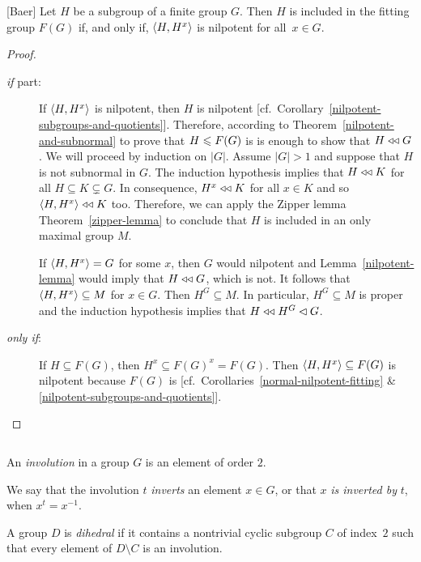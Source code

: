 \begin{thm}\label{baer-thm}{\rm[Baer]}
    Let\/ $H$ be a subgroup of a finite group\/ $G$. Then $H$ is included in the fitting group $F(G)$ if, and only if, $\langle H,H^x\rangle$ is nilpotent for all\/~$x\in G$.
\end{thm}

\begin{proof}${}$

\begin{description}
    \item[\rm{\it if\/} part:] If $\langle H,H^x\rangle$ is nilpotent, then $H$ is nilpotent [cf.~Corollary~\ref{nilpotent-subgroups-and-quotients}]. Therefore, according to Theorem~\ref{nilpotent-and-subnormal} to prove that $H\leqslant F(G)$ is is enough to show that $H\mathrel{\triangleleft\triangleleft} G$. We will proceed by induction on $|G|$. Assume $|G|>1$ and suppose that $H$ is not subnormal in $G$. The induction hypothesis implies that $H\mathrel{\triangleleft\triangleleft} K$ for all $H\subseteq K\varsubsetneq G$. In consequence, $H^x\mathrel{\triangleleft\triangleleft} K$ for all $x\in K$ and so $\langle H,H^x\rangle\mathrel{\triangleleft\triangleleft} K$ too. Therefore, we can apply the Zipper lemma Theorem~\ref{zipper-lemma} to conclude that $H$ is included in an only maximal group $M$.

    If $\langle H,H^x\rangle=G$ for some $x$, then $G$ would nilpotent and Lemma~\ref{nilpotent-lemma} would imply that $H\mathrel{\triangleleft\triangleleft} G$, which is not. It follows that $\langle H,H^x\rangle\subseteq M$ for $x\in G$. Then $H^G\subseteq M$. In particular, $H^G\subseteq M$ is proper and the induction hypothesis implies that $H\mathrel{\triangleleft\triangleleft} H^G\lhd G$.

    \item[\rm{\it only if\/}:] If $H\subseteq F(G)$, then $H^x\subseteq F(G)^x=F(G)$. Then $\langle H,H^x\rangle\subseteq F(G)$ is nilpotent because $F(G)$ is [cf.~Corollaries~\ref{normal-nilpotent-fitting} \& \ref{nilpotent-subgroups-and-quotients}].
\end{description}
\end{proof}


\begin{defns}${}$\label{def:dihedral-group}

    An \textsl{involution} in a group\/ $G$ is an element of order\/ $2$.

    We say that the involution $t$ \textsl{inverts} an element $x\in G$, or that $x$ \textsl{is inverted by} $t$, when $x^t=x^{-1}$.

    A group\/ $D$ is \textsl{dihedral} if it contains a nontrivial cyclic subgroup\/ $C$ of index\/~$2$ such that every element of\/ $D \setminus C$ is an involution.
\end{defns}

